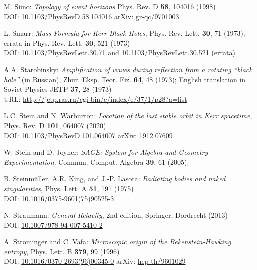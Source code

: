 \begin{thebibliography}{123}
M. Siino: {\em Topology of event horizons}
Phys. Rev. D {\bf 58}, 104016 (1998)\\
DOI: \href{https://doi.org/10.1103/PhysRevD.58.104016}{10.1103/PhysRevD.58.104016}\hfill
arXiv: \href{https://arxiv.org/abs/gr-qc/9701003}{gr-qc/9701003}

L. Smarr: {\em Mass Formula for Kerr Black Holes},
Phys. Rev. Lett. {\bf 30}, 71 (1973); errata in Phys. Rev. Lett. {\bf 30}, 521 (1973)\\
DOI: \href{https://doi.org/10.1103/PhysRevLett.30.71}{10.1103/PhysRevLett.30.71}
and
\href{https://doi.org/10.1103/PhysRevLett.30.521}{10.1103/PhysRevLett.30.521} (errata)

A.A. Starobinsky:
{\em Amplification of waves during reflection from a rotating ``black hole''} (in Russian),
Zhur. Eksp. Teor. Fiz. {\bf 64}, 48 (1973); English translation in
Soviet Physics JETP {\bf 37}, 28 (1973)\\
URL: \url{http://jetp.ras.ru/cgi-bin/e/index/e/37/1/p28?a=list}

L.C. Stein and N. Warburton:
{\em Location of the last stable orbit in Kerr spacetime},
Phys. Rev. D  {\bf 101}, 064007 (2020)\\
DOI: \href{https://doi.org/10.1103/PhysRevD.101.064007}{10.1103/PhysRevD.101.064007}\hfill
arXiv: \href{https://arxiv.org/abs/1912.07609}{1912.07609}

W. Stein and D. Joyner:
{\em SAGE: System for Algebra and Geometry Experimentation},
Commun. Comput. Algebra {\bf 39}, 61 (2005).

B. Steinmüller, A.R. King, and J.-P. Lasota:
{\em Radiating bodies and naked singularities},
Phys. Lett. A {\bf 51}, 191 (1975)\\
DOI: \href{https://doi.org/10.1016/0375-9601(75)90525-3}{10.1016/0375-9601(75)90525-3}

N. Straumann:
{\em General Relavity}, 2nd edition,
Springer, Dordrecht (2013)\\
DOI: \href{https://doi.org/10.1007/978-94-007-5410-2}{10.1007/978-94-007-5410-2}

A. Strominger and C. Vafa:
{\em Microscopic origin of the Bekenstein-Hawking entropy},
Phys. Lett. B {\bf 379}, 99 (1996)\\
DOI: \href{https://doi.org/10.1016/0370-2693(96)00345-0}{10.1016/0370-2693(96)00345-0}\hfill
arXiv: \href{https://arxiv.org/abs/hep-th/9601029}{hep-th/9601029}


\end{thebibliography}
